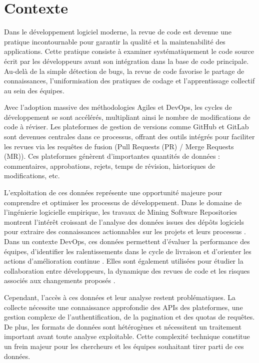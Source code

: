 \section{Contexte}

Dans le développement logiciel moderne, la revue de code est devenue une pratique incontournable pour garantir la qualité et la maintenabilité des applications. Cette pratique consiste à examiner systématiquement le code source écrit par les développeurs avant son intégration dans la base de code principale. Au-delà de la simple détection de bugs, la revue de code favorise le partage de connaissances, l'uniformisation des pratiques de codage et l'apprentissage collectif au sein des équipes.

Avec l'adoption massive des méthodologies Agiles et DevOps, les cycles de développement se sont accélérés, multipliant ainsi le nombre de modifications de code à réviser. Les plateformes de gestion de versions comme GitHub et GitLab sont devenues centrales dans ce processus, offrant des outils intégrés pour faciliter les revues via les requêtes de fusion (Pull Requests (PR) / Merge Requests (MR)). Ces plateformes génèrent d'importantes quantités de données : commentaires, approbations, rejets, temps de révision, historiques de modifications, etc.

L’exploitation de ces données représente une opportunité majeure pour comprendre et optimiser les processus de développement. Dans le domaine de l’ingénierie logicielle empirique, les travaux de Mining Software Repositories montrent l’intérêt croissant de l’analyse des données issues des dépôts logiciels pour extraire des connaissances actionnables sur les projets et leurs processus \cite{vidoni2022systematic}. Dans un contexte DevOps, ces données permettent d’évaluer la performance des équipes, d’identifier les ralentissements dans le cycle de livraison et d’orienter les actions d’amélioration continue \cite{debellis2024dora,kudrjavets2024speed}. Elles sont également utilisées pour étudier la collaboration entre développeurs, la dynamique des revues de code et les risques associés aux changements proposés \cite{bacchelli2013expectations,gocmen2025enhanced}.

Cependant, l’accès à ces données et leur analyse restent problématiques. La collecte nécessite une connaissance approfondie des APIs des plateformes, une gestion complexe de l'authentification, de la pagination et des quotas de requêtes. De plus, les formats de données sont hétérogènes et nécessitent un traitement important avant toute analyse exploitable. Cette complexité technique constitue un frein majeur pour les chercheurs et les équipes souhaitant tirer parti de ces données.

